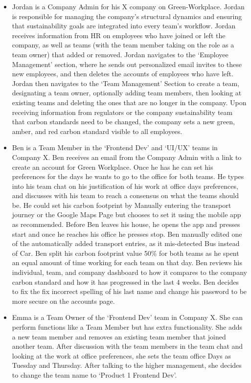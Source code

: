 \documentclass{l4proj}
\begin{document}
\begin{itemize}
    \item Jordan is a Company Admin for his X company on Green-Workplace. Jordan is responsible for managing the company's structural dynamics and ensuring that sustainability goals are integrated into every team's workflow. Jordan receives information from HR on employees who have joined or left the company, as well as teams (with the team member taking on the role as a team owner) that added or removed. Jordan navigates to the ‘Employee Management’ section, where he sends out personalized email invites to these new employees, and then deletes the accounts of employees who have left. Jordan then navigates to the ‘Team Management’ Section to create a team, designating a team owner, optionally adding team members, then looking at existing teams and deleting the ones that are no longer in the company. Upon receiving information from regulators or the company sustainability team that carbon standards need to be changed, the company sets a new green,  amber, and red carbon standard visible to all employees.
    \item Ben is a Team Member in the ‘Frontend Dev’ and ‘UI/UX’ teams in Company X. Ben receives an email from the Company Admin with a link to create an account for Green Workplace. Once he has he can set his preferences for the days he wants to go to the office for both teams. He types into his team chat on his justification of his work at office days preferences, and discusses with his team to reach a consensus on what the teams should be. He could set his carbon footprint by Manually entering the transport journey or the Google Maps Page but chooses to set it using the mobile app as recommended. Before Ben leaves his house, he opens the app and presses start and once he reaches his office he presses stop. Ben manually edited one of the automatically added transport entries, as it mis-detected Bus instead of Car. Ben split his carbon footprint value 50\% for both teams as he spent an equal amount of time working for each team on that day. Ben reviews his individual, team, and company dashboard to how it compares to the company carbon standard and how it has progressed in the last 4 weeks. Ben decides to fix the fix incorrect spelling of his last name and change his password to be more secure on the accounts page.
    \item Emma is a Team Owner of the ‘Frontend Dev’ team in Company X. She can perform functions like a Team Member but has extra functionality. She adds a new team member and removes an existing team member that joined another team. After discussion with the team members in the team chat and looking at the work at office preferences, she sets the team office Days as Tuesday and Thursday. After talking to the higher management, she decides to change the team name to ‘Product 1 Frontend Dev’.
\end{itemize}
\end{document}
